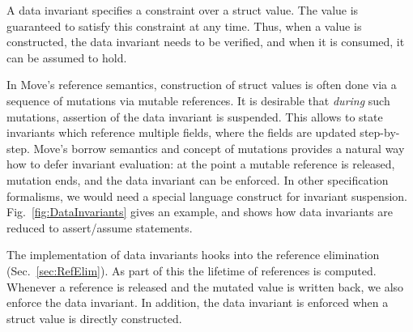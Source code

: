 A data invariant specifies a constraint over a struct value. The value is
guaranteed to satisfy this constraint at any time. Thus, when a value is
constructed, the data invariant needs to be verified, and when it is consumed,
it can be assumed to hold.

In Move's reference semantics, construction of struct values is often done via a
sequence of mutations via mutable references. It is desirable that \emph{during}
such mutations, assertion of the data invariant is suspended. This allows to
state invariants which reference multiple fields, where the fields are updated
step-by-step.  Move's borrow semantics and concept of mutations provides a
natural way how to defer invariant evaluation: at the point a mutable reference
is released, mutation ends, and the data invariant can be enforced.  In other
specification formalisms, we would need a special language construct for
invariant suspension. Fig.~\ref{fig:DataInvariants} gives an example, and shows
how data invariants are reduced to assert/assume statements.

The implementation of data invariants hooks into the reference elimination
(Sec.~\ref{sec:RefElim}). As part of this the lifetime of references is
computed. Whenever a reference is released and the mutated value is written
back, we also enforce the data invariant. In addition, the data invariant is
enforced when a struct value is directly constructed.


